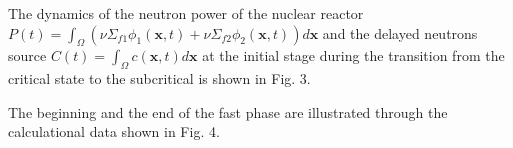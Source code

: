 \documentclass[landscape,a1paper,fontscale=0.5]{poster}
\begin{document}
\begin{poster}
{\vspace{0.5em}
The dynamics of the neutron power of the nuclear reactor  $P(t) = \int_{\Omega} (\nu\Sigma_{f1} \phi_1(\bm x,t) + \nu\Sigma_{f2} \phi_2(\bm x,t))  d \bm x$ and the delayed neutrons source $C(t) = \int_{\Omega} c(\bm x,t) d \bm x$ at the initial stage during the transition from the critical state to the subcritical is shown in Fig. 3. 

\vspace{0.5em}
The beginning and the end of the fast phase are illustrated through the
calculational data shown in Fig. 4.

\begin{center}
\begin{minipage}{0.051\linewidth}
 \\
\end{minipage}
\hfill
\begin{minipage}{0.3\linewidth}
 \\
\end{minipage}
\hfill
\begin{minipage}{0.3\linewidth}
 \\
\end{minipage}

\end{center}}
\end{poster}
\end{document}
